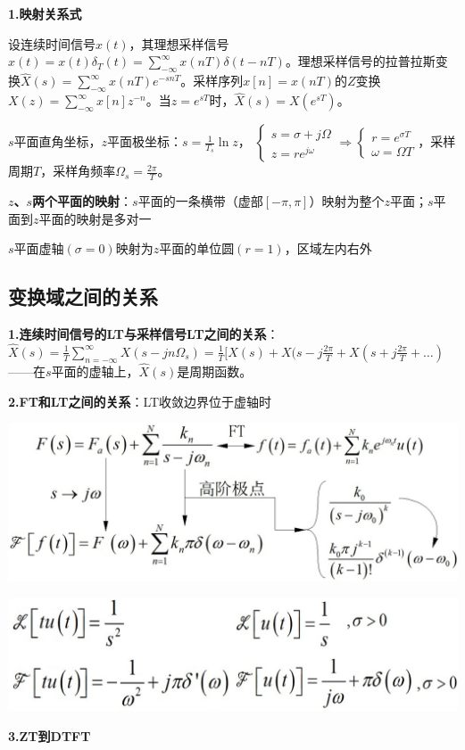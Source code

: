 \textbf{1.映射关系式}

设连续时间信号$x(t)$，其理想采样信号$\widehat{x}(t)\!=\!x(t)\delta_T(t)\!=\!\sum_{-\infty}^\infty\!x(nT)\delta(t\!-\!nT)$。理想采样信号的拉普拉斯变换$\widehat{X}(s)\!=\!\sum_{-\infty}^\infty\!x(nT)e^{-snT}$。采样序列$x[n]\!=\!x(nT)$的$Z$变换$X(z)\!=\!\sum_{-\infty}^\infty\!x[n]z^{-n}$。当$z\!=\!e^{sT}$时，$\widehat{X}(s)\!=\!X(e^{sT})$。

$s$平面直角坐标，$z$平面极坐标：$s\!=\!\tfrac{1}{T_s}\ln z$，
$\begin{cases}s\!=\!\sigma\!+\!j\Omega\\z\!=\!re^{j\omega}\end{cases}\!\Rightarrow\!\begin{cases}r\!=\!e^{\sigma T}\\\omega\!=\!\Omega T\end{cases}$，采样周期$T$，采样角频率$\Omega_s\!=\!\tfrac{2\pi}{T}$。

\textbf{$z$、$s$两个平面的映射}：$s$平面的一条横带（虚部$[-\pi,\pi]$）映射为整个$z$平面；$s$平面到$z$平面的映射是多对一

$s$平面虚轴$(\sigma=0)$映射为$z$平面的单位圆$(r=1)$，区域左内右外

\subsection*{变换域之间的关系}

\textbf{1.连续时间信号的LT与采样信号LT之间的关系}：$\widehat{X}(s)=\frac{1}{T}\sum\limits_{n=-\infty}^\infty{X(s-jn\Omega_s)}=\frac{1}{T}[X(s)+X(s-j\frac{2\pi}{T}+X(s+j\frac{2\pi}{T}+…)$——在$s$平面的虚轴上，$\widehat{X}(s)$是周期函数。

\textbf{2.FT和LT之间的关系}：LT收敛边界位于虚轴时

\begin{figurehere}
	\centering
	\includegraphics[width=1\linewidth]{image01}
	\label{fig:image01}
\end{figurehere}
\begin{figurehere}
	\centering
	\includegraphics[width=0.95\linewidth]{image02}
	\label{fig:image02}
\end{figurehere}
\textbf{3.ZT到DTFT}


